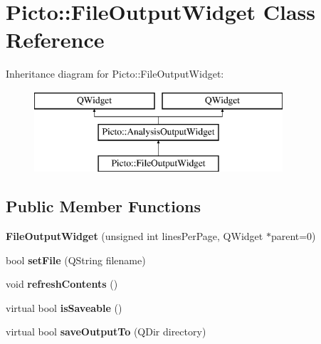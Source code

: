 \hypertarget{class_picto_1_1_file_output_widget}{\section{Picto\-:\-:File\-Output\-Widget Class Reference}
\label{class_picto_1_1_file_output_widget}
}
Inheritance diagram for Picto\-:\-:File\-Output\-Widget\-:\begin{figure}[H]
\begin{center}
\leavevmode
\includegraphics[height=3.000000cm]{class_picto_1_1_file_output_widget}
\end{center}
\end{figure}
\subsection*{Public Member Functions}
\begin{DoxyCompactItemize}
\item 
\hypertarget{class_picto_1_1_file_output_widget_afa1261874953d9c6e2fb25f6244166cf}{{\bfseries File\-Output\-Widget} (unsigned int lines\-Per\-Page, Q\-Widget $\ast$parent=0)}\label{class_picto_1_1_file_output_widget_afa1261874953d9c6e2fb25f6244166cf}

\item 
\hypertarget{class_picto_1_1_file_output_widget_ac6aa106c72b4abb4c5791911d84e1c53}{bool {\bfseries set\-File} (Q\-String filename)}\label{class_picto_1_1_file_output_widget_ac6aa106c72b4abb4c5791911d84e1c53}

\item 
\hypertarget{class_picto_1_1_file_output_widget_a424819ffa23c8d7eff94625e0e1540c7}{void {\bfseries refresh\-Contents} ()}\label{class_picto_1_1_file_output_widget_a424819ffa23c8d7eff94625e0e1540c7}

\item 
\hypertarget{class_picto_1_1_file_output_widget_a79313a2018c8e1957838560c0f52db6b}{virtual bool {\bfseries is\-Saveable} ()}\label{class_picto_1_1_file_output_widget_a79313a2018c8e1957838560c0f52db6b}

\item 
\hypertarget{class_picto_1_1_file_output_widget_ad6514105048d06fa41eaef6066edee1e}{virtual bool {\bfseries save\-Output\-To} (Q\-Dir directory)}\label{class_picto_1_1_file_output_widget_ad6514105048d06fa41eaef6066edee1e}

\end{DoxyCompactItemize}


